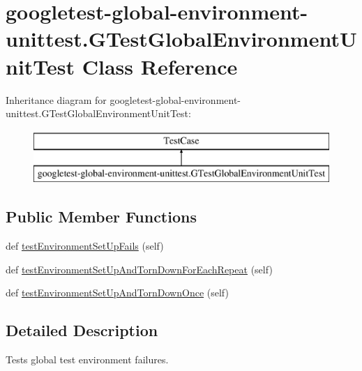 \hypertarget{classgoogletest-global-environment-unittest_1_1GTestGlobalEnvironmentUnitTest}{}\section{googletest-\/global-\/environment-\/unittest.G\+Test\+Global\+Environment\+Unit\+Test Class Reference}
\label{classgoogletest-global-environment-unittest_1_1GTestGlobalEnvironmentUnitTest}
Inheritance diagram for googletest-\/global-\/environment-\/unittest.G\+Test\+Global\+Environment\+Unit\+Test\+:\begin{figure}[H]
\begin{center}
\leavevmode
\includegraphics[height=2.000000cm]{classgoogletest-global-environment-unittest_1_1GTestGlobalEnvironmentUnitTest}
\end{center}
\end{figure}
\subsection*{Public Member Functions}
\begin{DoxyCompactItemize}
\item 
def \mbox{\hyperlink{classgoogletest-global-environment-unittest_1_1GTestGlobalEnvironmentUnitTest_a89551752cbf7bfdd43d7c397e18d1bbb}{test\+Environment\+Set\+Up\+Fails}} (self)
\item 
def \mbox{\hyperlink{classgoogletest-global-environment-unittest_1_1GTestGlobalEnvironmentUnitTest_af554d3c20bfddd4b92638fc731dca90e}{test\+Environment\+Set\+Up\+And\+Torn\+Down\+For\+Each\+Repeat}} (self)
\item 
def \mbox{\hyperlink{classgoogletest-global-environment-unittest_1_1GTestGlobalEnvironmentUnitTest_a7c6c757aefa621fe2746fcb8fef1f25c}{test\+Environment\+Set\+Up\+And\+Torn\+Down\+Once}} (self)
\end{DoxyCompactItemize}


\subsection{Detailed Description}
\begin{DoxyVerb}Tests global test environment failures.\end{DoxyVerb}
 

